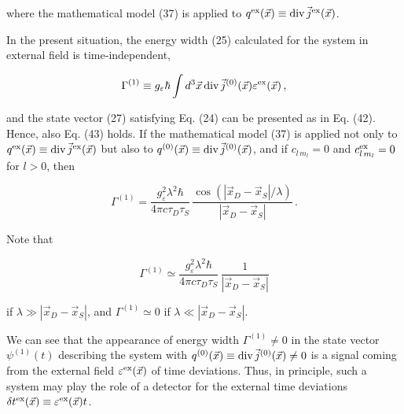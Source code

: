 \documentclass[a4paper,12pt]{article}
\begin{document}
\ni where the mathematical model (37) is applied to $q^{\rm ex}(\vec{x}) \equiv {\rm div}\, \vec{j}^{\rm ex}(\vec{x})$.

In the present situation, the energy width (25) calculated for the system in external field is time-independent,
      
\begin{equation}
\Gamma^{(1)} \equiv g_\varepsilon \hbar \int d^3\vec{x}\,{\rm div}\, \vec{j}^{(0)}(\vec{x}) \varepsilon^{\rm ex}(\vec{x}) \,,
\end{equation}

\ni and the state vector (27) satisfying Eq. (24) can be presented as in Eq. (42). Hence, also Eq. (43) holds. If the mathematical model (37) is applied not only to $q^{\rm ex}(\vec{x}) \equiv {\rm div}\, \vec{j}^{\rm ex}(\vec{x})$ but also to $q^{(0)}(\vec{x}) \equiv {\rm div}\, \vec{j}^{(0)}(\vec{x})$, and if $c_{l\, m_l} = 0$ and $c^{\rm ex}_{l\, m_l} = 0$ for $l>0$, then

\begin{equation}
\Gamma^{(1)} = \frac{g^2_\varepsilon \lambda^2 \hbar}{4\pi c \tau_D \tau_S}\, \frac{\cos (|\vec{x}_D - \vec{x}_S| /\lambda)}{|\vec{x}_D - \vec{x}_S|} \,.
\end{equation}

\ni Note that

\begin{equation}
\Gamma^{(1)} \simeq \frac{g^2_\varepsilon \lambda^2 \hbar}{4\pi c \tau_D \tau_S}\, \frac{1}{|\vec{x}_D - \vec{x}_S|}
\end{equation}

\ni if $\lambda \gg |\vec{x}_D - \vec{x}_S|$, and $\Gamma^{(1)} \simeq 0$ if $\lambda \ll |\vec{x}_D - \vec{x}_S|$.

We can see that the appearance of energy width $\Gamma^{(1)} \neq 0$ in the state vector $\psi^{(1)}(t)$ describing the system with $q^{(0)}(\vec{x}) \equiv {\rm div}\, \vec{j}^{(0)}(\vec{x}) \neq 0$ is a signal coming from the external field $\varepsilon^{\rm ex}(\vec{x})$ of time deviations. Thus, in principle, such a system may play the role of a detector for the external time deviations $\delta t^{\rm ex}(\vec{x}) \equiv \varepsilon^{\rm ex}(\vec{x}) t$.

\vspace{0.2cm}


\vspace{0.2cm}
\end{document}
